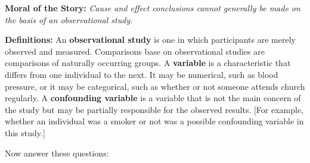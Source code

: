 \documentclass[12pt]{amsart}
\begin{document}
{{\bf Moral of the Story: } {\it Cause and effect conclusions cannot generally be made on the basis of an observational study.}

{\bf Definitions: } An {\bf observational study} is one in which participants are merely observed and measured. Comparisons base on observational studies are comparisons of naturally occurring groups. A {\bf variable} is a characteristic that differs from one individual to the next. It may be numerical, such as blood pressure, or it may be categorical, such as whether or not someone attends church regularly. A {\bf confounding variable} is a variable that is not the main concern of the study but may be partially responsible for the observed results. [For example, whether an individual was a smoker or not was a possible confounding variable in this study.]

}\vspace{.2in}
Now answer these questions:
\medskip
{}
\end{document}
